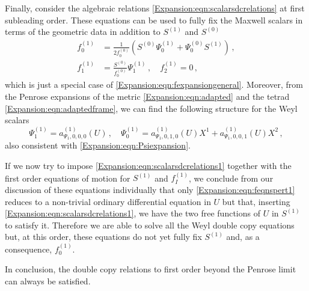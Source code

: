 Finally, consider the algebraic relations \eqref{Expansion:eqn:scalarsdcrelations} at first subleading order. These equations can be used to fully fix the Maxwell scalars in terms of the geometric data in addition to $S^{(1)}$ and $S^{(0)}$
\begin{equation}\label{Expansion:eqn:scalarsdcrelations1}
\begin{aligned}
f_0^{(1)} &= \frac{1}{ 2f_0^{(0)}}(S^{(0)}\Psi_0^{(1)}+\Psi_0^{(0)} S^{(1)})  \, , \\
f^{(1)}_1 &= \frac{S^{(0)}}{f_0^{(0)}} \Psi_1^{(1)} \, , \quad f_2^{(1)} = 0 \, ,
\end{aligned}
\end{equation}
which is just a special case of \eqref{Expansion:eqn:fexpansiongeneral}. Moreover, from the Penrose expansions of the metric \eqref{Expansion:eqn:adapted} and the tetrad \eqref{Expansion:eqn:adaptedframe},  we can find the following structure for the Weyl scalars 
\begin{equation}
\Psi_1^{(1)}  = a^{(1)}_{\Psi_1,0, 0,0}(U) \, , \quad \Psi_0^{(1)} =  a^{(1)}_{\Psi_1,0, 1,0}(U)  X^1 + a^{(1)}_{\Psi_1,0, 0,1}(U)  X^2 \, ,
\end{equation}
also consistent with \eqref{Expansion:eqn:Psiexpansion}.

If we now try to impose \eqref{Expansion:eqn:scalarsdcrelations1} together with the first order equations of motion for $S^{(1)}$ and $f^{(1)}_I$, we conclude from our discussion of these equations individually that only \eqref{Expansion:eqn:feqnspert1} reduces to a non-trivial ordinary differential equation in $U$ but that, inserting \eqref{Expansion:eqn:scalarsdcrelations1}, we have the two free functions of $U$ in $S^{(1)}$ to satisfy it. Therefore we are able to solve all the Weyl double copy equations but, at this order, these equations do not yet fully fix $S^{(1)}$ and, as a consequence, $f_0^{(1)}$. 

In conclusion, the double copy relations to first order beyond the Penrose limit can always be satisfied.

